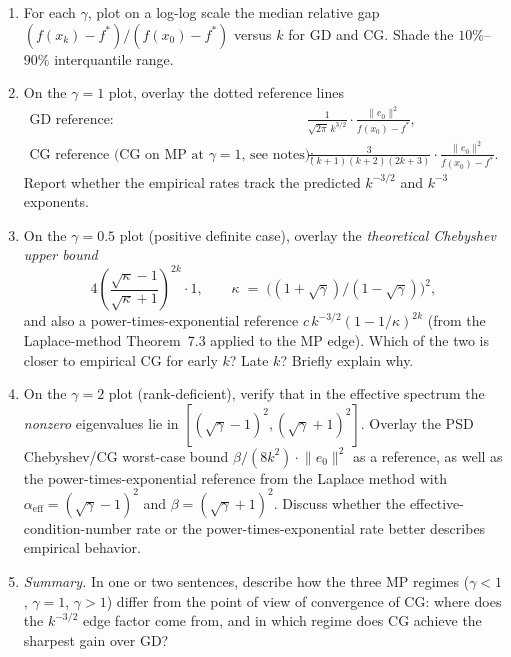 \documentclass[11pt]{article}
\newcommand{\bstar}{f^\ast}
\newcommand{\norm}[1]{\lVert #1\rVert}
\begin{document}
\begin{enumerate}[label=\textbf{E\arabic*.}, leftmargin=0pt, itemindent=2.5em]
\begin{enumerate}[label=(\alph*)]
\item For each $\gamma$, plot on a log-log scale the median relative gap $(f(x_k)-\bstar)/(f(x_0)-\bstar)$ versus $k$ for GD and CG. Shade the $10\%$--$90\%$ interquantile range.

\item On the $\gamma=1$ plot, overlay the dotted reference lines
\begin{align*}
\text{GD reference:}\quad &\frac{1}{\sqrt{2\pi}\,k^{3/2}}\cdot\frac{\norm{e_0}^2}{f(x_0)-\bstar},\\[2pt]
\text{CG reference (CG on MP at $\gamma=1$, see notes):}\quad &\frac{3}{(k+1)(k+2)(2k+3)}\cdot\frac{\norm{e_0}^2}{f(x_0)-\bstar}.
\end{align*}
Report whether the empirical rates track the predicted $k^{-3/2}$ and $k^{-3}$ exponents.

\item On the $\gamma=0.5$ plot (positive definite case), overlay the \emph{theoretical Chebyshev upper bound}
\[
4\left(\frac{\sqrt{\kappa}-1}{\sqrt{\kappa}+1}\right)^{2k}\cdot 1,\qquad \kappa\;=\;\bigl((1+\sqrt\gamma)/(1-\sqrt\gamma)\bigr)^2,
\]
and also a power-times-exponential reference $c\,k^{-3/2}(1-1/\kappa)^{2k}$ (from the Laplace-method Theorem~7.3 applied to the MP edge). Which of the two is closer to empirical CG for early $k$? Late $k$? Briefly explain why.

\item On the $\gamma=2$ plot (rank-deficient), verify that in the effective spectrum the \emph{nonzero} eigenvalues lie in $[(\sqrt\gamma-1)^2,(\sqrt\gamma+1)^2]$. Overlay the PSD Chebyshev/CG worst-case bound $\beta/(8k^2)\cdot\norm{e_0}^2$ as a reference, as well as the power-times-exponential reference from the Laplace method with $\alpha_{\mathrm{eff}}=(\sqrt\gamma-1)^2$ and $\beta=(\sqrt\gamma+1)^2$. Discuss whether the effective-condition-number rate or the power-times-exponential rate better describes empirical behavior.

\item \emph{Summary.} In one or two sentences, describe how the three MP regimes ($\gamma<1$, $\gamma=1$, $\gamma>1$) differ from the point of view of convergence of CG: where does the $k^{-3/2}$ edge factor come from, and in which regime does CG achieve the sharpest gain over GD?
\end{enumerate}

\end{enumerate}
\end{document}
